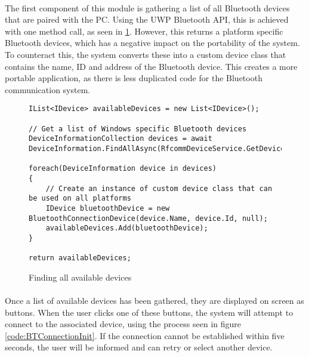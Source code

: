 {		\paragraph{}{
		The first component of this module is gathering a list of all Bluetooth devices that are paired	with the PC. Using the UWP Bluetooth API, this is achieved with one method call, as seen in \ref{code:AvailableDevices}. However, this returns a platform specific Bluetooth devices, which has a negative impact on the portability of the system. To counteract this, the system converts these into a custom device class that contains the name, ID and address of the Bluetooth device. This creates a more portable application, as there is less duplicated code for the Bluetooth communication system.
		}
		}
		
		\begin{figure}[h]
			\begin{lstlisting}
IList<IDevice> availableDevices = new List<IDevice>();

// Get a list of Windows specific Bluetooth devices
DeviceInformationCollection devices = await DeviceInformation.FindAllAsync(RfcommDeviceService.GetDeviceSelector(RfcommServiceId.SerialPort));

foreach(DeviceInformation device in devices)
{
	// Create an instance of custom device class that can be used on all platforms
	IDevice bluetoothDevice = new BluetoothConnectionDevice(device.Name, device.Id, null);
    availableDevices.Add(bluetoothDevice);
}

return availableDevices;
			\end{lstlisting}
			\caption{Finding all available devices}
			\label{code:AvailableDevices}
		\end{figure}
		
		\paragraph{}{
		Once a list of available devices has been gathered, they are displayed on screen as buttons. When the user clicks one of these buttons, the system will attempt to connect to the associated device, using the process seen in figure \ref{code:BTConnectionInit}. If the connection cannot be established within five seconds, the user will be informed and can retry or select another device.
		}				
		

